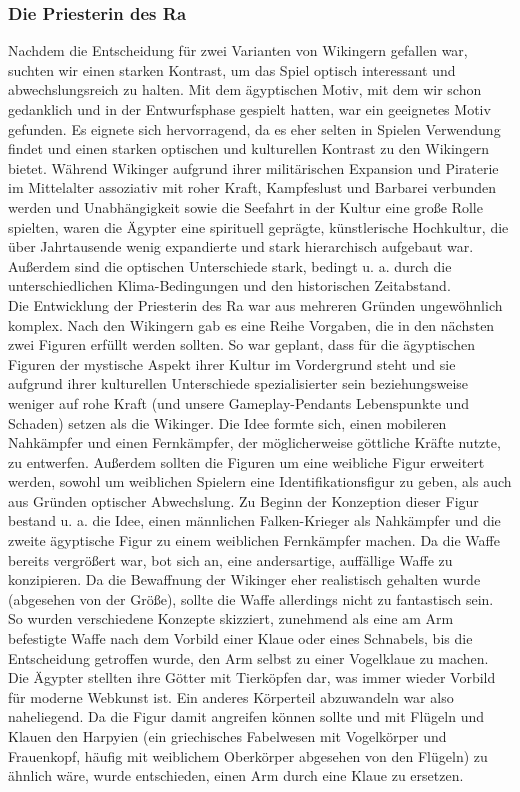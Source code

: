 \documentclass[extern,palatino]{cgBA}
\begin{document}
\subsubsection{Die Priesterin des Ra}
Nachdem die Entscheidung für zwei Varianten von Wikingern gefallen war, suchten wir einen starken Kontrast, um das Spiel optisch interessant und abwechslungsreich zu halten. Mit dem ägyptischen Motiv, mit dem wir schon gedanklich und in der Entwurfsphase gespielt hatten, war ein geeignetes Motiv gefunden. Es eignete sich hervorragend, da es eher selten in Spielen Verwendung findet und einen starken optischen und kulturellen Kontrast zu den Wikingern bietet. Während Wikinger aufgrund ihrer militärischen Expansion und Piraterie im Mittelalter assoziativ mit roher Kraft, Kampfeslust und Barbarei verbunden werden und Unabhängigkeit sowie die Seefahrt in der Kultur eine große Rolle spielten, waren die Ägypter eine spirituell geprägte, künstlerische Hochkultur\cite{egy}, die über Jahrtausende wenig expandierte und stark hierarchisch aufgebaut war. Außerdem sind die optischen Unterschiede stark, bedingt u. a. durch die unterschiedlichen Klima-Bedingungen und den historischen Zeitabstand. 
\\Die Entwicklung der Priesterin des Ra war aus mehreren Gründen ungewöhnlich komplex.
Nach den Wikingern gab es eine Reihe Vorgaben, die in den nächsten zwei Figuren erfüllt werden sollten. So war geplant, dass für die ägyptischen Figuren der mystische Aspekt ihrer Kultur im Vordergrund steht und sie aufgrund ihrer kulturellen Unterschiede spezialisierter sein beziehungsweise weniger auf rohe Kraft (und unsere Gameplay-Pendants Lebenspunkte und Schaden) setzen als die Wikinger. Die Idee formte sich, einen mobileren Nahkämpfer und einen Fernkämpfer, der möglicherweise göttliche Kräfte nutzte, zu entwerfen. Außerdem sollten die Figuren um eine weibliche Figur erweitert werden, sowohl um weiblichen Spielern eine Identifikationsfigur zu geben, als auch aus Gründen optischer Abwechslung. Zu Beginn der Konzeption dieser Figur bestand u. a. die Idee, einen männlichen Falken-Krieger als Nahkämpfer und die zweite ägyptische Figur zu einem weiblichen Fernkämpfer machen. Da die Waffe bereits vergrößert war, bot sich an, eine andersartige, auffällige Waffe zu konzipieren. Da die Bewaffnung der Wikinger eher realistisch gehalten wurde (abgesehen von der Größe), sollte die Waffe allerdings nicht zu fantastisch sein. So wurden verschiedene Konzepte skizziert, zunehmend als eine am Arm befestigte Waffe nach dem Vorbild einer Klaue oder eines Schnabels, bis die Entscheidung getroffen wurde, den Arm selbst zu einer Vogelklaue zu machen. Die Ägypter stellten ihre Götter mit Tierköpfen dar\cite{egyrel}, was immer wieder Vorbild für moderne Webkunst ist. Ein anderes Körperteil abzuwandeln war also naheliegend. Da die Figur damit angreifen können sollte und mit Flügeln und Klauen den Harpyien (ein griechisches Fabelwesen mit Vogelkörper und Frauenkopf, häufig mit weiblichem Oberkörper abgesehen von den Flügeln\cite{harp}) zu ähnlich wäre, wurde entschieden, einen Arm durch eine Klaue zu ersetzen.
\end{document}
